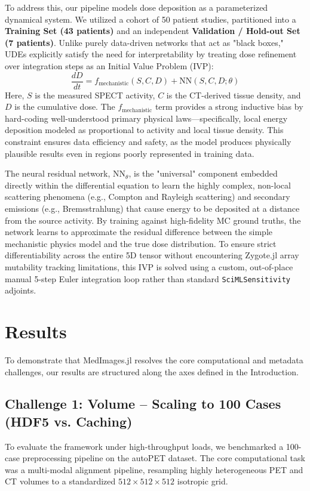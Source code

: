 \documentclass[10pt,letterpaper]{article}
\begin{document}
To address this, our pipeline models dose deposition as a parameterized dynamical system. We utilized a cohort of 50 patient studies, partitioned into a \textbf{Training Set (43 patients)} and an independent \textbf{Validation / Hold-out Set (7 patients)}. Unlike purely data-driven networks that act as "black boxes," UDEs explicitly satisfy the need for interpretability by treating dose refinement over integration steps as an Initial Value Problem (IVP):
\begin{equation}
\frac{dD}{dt} = f_{\text{mechanistic}}(S, C, D) + \text{NN}(S, C, D; \theta)
\end{equation}
Here, $S$ is the measured SPECT activity, $C$ is the CT-derived tissue density, and $D$ is the cumulative dose. The $f_{\text{mechanistic}}$ term provides a strong inductive bias by hard-coding well-understood primary physical laws—specifically, local energy deposition modeled as proportional to activity and local tissue density. This constraint ensures data efficiency and safety, as the model produces physically plausible results even in regions poorly represented in training data. 

The neural residual network, $\text{NN}_{\theta}$, is the "universal" component embedded directly within the differential equation to learn the highly complex, non-local scattering phenomena (e.g., Compton and Rayleigh scattering) and secondary emissions (e.g., Bremsstrahlung) that cause energy to be deposited at a distance from the source activity. By training against high-fidelity MC ground truths, the network learns to approximate the residual difference between the simple mechanistic physics model and the true dose distribution. To ensure strict differentiability across the entire 5D tensor without encountering Zygote.jl array mutability tracking limitations, this IVP is solved using a custom, out-of-place manual 5-step Euler integration loop rather than standard \texttt{SciMLSensitivity} adjoints.


\section{Results}
To demonstrate that MedImages.jl resolves the core computational and metadata challenges, our results are structured along the axes defined in the Introduction.

\subsection*{Challenge 1: Volume -- Scaling to 100 Cases (HDF5 vs. Caching)}
To evaluate the framework under high-throughput loads, we benchmarked a 100-case preprocessing pipeline on the autoPET dataset. The core computational task was a multi-modal alignment pipeline, resampling highly heterogeneous PET and CT volumes to a standardized $512 \times 512 \times 512$ isotropic grid. 
\end{document}
